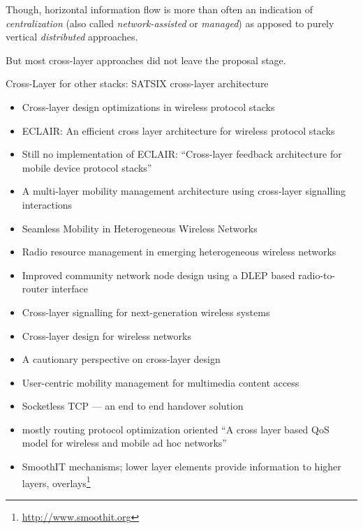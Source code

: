 Though, horizontal information flow is more than often an indication of \textit{centralization} (also called \textit{network-assisted} or \textit{managed}) as apposed to purely vertical \textit{distributed} approaches.




But most cross-layer approaches did not leave the proposal stage. 



Cross-Layer for other stacks: 
SATSIX cross-layer architecture \cite{4656786}


\begin{itemize}
	\item Cross-layer design optimizations in wireless protocol stacks \cite{Raisinghani2004720}
	\item ECLAIR: An efficient cross layer architecture for wireless protocol stacks \cite{raisinghani2004eclair}
	\item Still no implementation of ECLAIR: ``Cross-layer feedback architecture for mobile device protocol stacks'' \cite{1580937}
	\item A multi-layer mobility management architecture using cross-layer signalling interactions\cite{wang2003multi}
	\item Seamless Mobility in Heterogeneous Wireless Networks \cite{zarai2010seamless}
	\item Radio resource management in emerging heterogeneous wireless networks \cite{Piamrat20111066}
	\item Improved community network node design using a DLEP based radio-to-router interface \cite{6379143}
	\item Cross-layer signalling for next-generation wireless systems \cite{1200522}
	\item Cross-layer design for wireless networks \cite{1235598}
	\item A cautionary perspective on cross-layer design \cite{1404568}
	\item User-centric mobility management for multimedia content access \cite{bolla2011usercentric}
	\item Socketless \gls{TCP} --- an end to end handover solution \cite{1635680}
	\item mostly routing protocol optimization oriented ``A cross layer based QoS model for wireless and mobile ad hoc networks'' \cite{krishna2007cross}
	\item SmoothIT mechanisms; lower layer elements provide information to higher layers, overlays\footnote{\url{http://www.smoothit.org}}  \cite{oechsner2009pushing}

\end{itemize}
